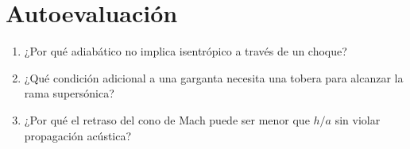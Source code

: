 \section{Autoevaluación}
\begin{enumerate}
\item ¿Por qué adiabático no implica isentrópico a través de un choque?
\item ¿Qué condición adicional a una garganta necesita una tobera para alcanzar la rama supersónica?
\item ¿Por qué el retraso del cono de Mach puede ser menor que $h/a$ sin violar propagación acústica?
\end{enumerate}


\studiumchaptercheck
